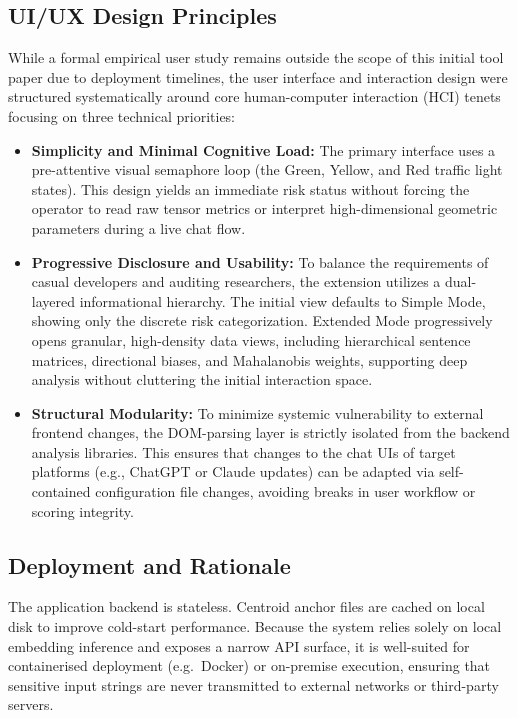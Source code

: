 \documentclass[runningheads]{llncs}
\begin{document}
\subsection{UI/UX Design Principles}
\label{subsec:ui-ux-principles}
While a formal empirical user study remains outside the scope of this initial tool paper due to deployment timelines, the user interface and interaction design were structured systematically around core human-computer interaction (HCI) tenets focusing on three technical priorities:
\begin{itemize}
  \item \textbf{Simplicity and Minimal Cognitive Load:} The primary interface uses a pre-attentive visual semaphore loop (the Green, Yellow, and Red traffic light states). This design yields an immediate risk status without forcing the operator to read raw tensor metrics or interpret high-dimensional geometric parameters during a live chat flow.
  \item \textbf{Progressive Disclosure and Usability:} To balance the requirements of casual developers and auditing researchers, the extension utilizes a dual-layered informational hierarchy. The initial view defaults to Simple Mode, showing only the discrete risk categorization. Extended Mode progressively opens granular, high-density data views, including hierarchical sentence matrices, directional biases, and Mahalanobis weights, supporting deep analysis without cluttering the initial interaction space.
  \item \textbf{Structural Modularity:} To minimize systemic vulnerability to external frontend changes, the DOM-parsing layer is strictly isolated from the backend analysis libraries. This ensures that changes to the chat UIs of target platforms (e.g., ChatGPT or Claude updates) can be adapted via self-contained configuration file changes, avoiding breaks in user workflow or scoring integrity.
\end{itemize}

\subsection{Deployment and Rationale}
\label{subsec:deployment}
The application backend is stateless. Centroid anchor files are cached on local disk to improve cold-start performance. Because the system relies solely on local embedding inference and exposes a narrow API surface, it is well-suited for containerised deployment (e.g.\ Docker) or on-premise execution, ensuring that sensitive input strings are never transmitted to external networks or third-party servers.
\end{document}
